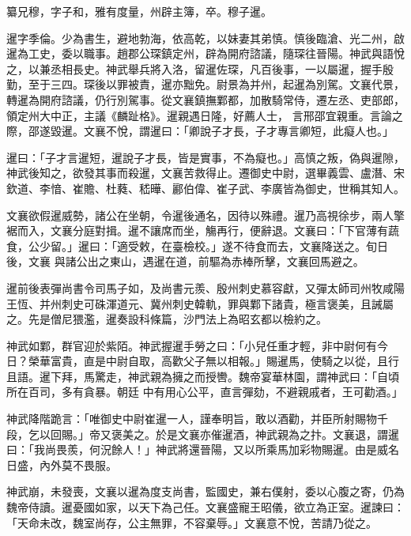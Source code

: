 \begin{pinyinscope}
 纂兄穆，字子和，雅有度量，州辟主簿，卒。穆子暹。



 暹字季倫。少為書生，避地勃海，依高乾，以妹妻其弟慎。慎後臨滄、光二州，啟暹為工史，委以職事。趙郡公琛鎮定州，辟為開府諮議，隨琛往晉陽。神武與語悅之，以兼丞相長史。神武舉兵將入洛，留暹佐琛，凡百後事，一以屬暹，握手殷勤，至于三四。琛後以罪被責，暹亦黜免。尉景為并州，起暹為別駕。文襄代景，轉暹為開府諮議，仍行別駕事。從文襄鎮撫鄴都，加散騎常侍，遷左丞、吏部郎，領定州大中正，主議《麟趾格》。暹親遇日隆，好薦人士，
 言邢邵宜親重。言論之際，邵遂毀暹。文襄不悅，謂暹曰：「卿說子才長，子才專言卿短，此癡人也。」



 暹曰：「子才言暹短，暹說子才長，皆是實事，不為癡也。」高慎之叛，偽與暹隙，神武後知之，欲發其事而殺暹，文襄苦救得止。遷御史中尉，選畢義雲、盧潛、宋欽道、李愔、崔贍、杜蕤、嵇曄、酈伯偉、崔子武、李廣皆為御史，世稱其知人。



 文襄欲假暹威勢，諸公在坐朝，令暹後通名，因待以殊禮。暹乃高視徐步，兩人擎裾而入，文襄分庭對揖。暹不讓席而坐，觴再行，便辭退。文襄曰：「下官薄有蔬食，公少留。」暹曰：「適受敕，在臺檢校。」遂不待食而去，文襄降送之。旬日後，文襄
 與諸公出之東山，遇暹在道，前驅為赤棒所擊，文襄回馬避之。



 暹前後表彈尚書令司馬子如，及尚書元羨、殷州刺史慕容獻，又彈太師司州牧咸陽王恆、并州刺史可硃渾道元、冀州刺史韓軌，罪與鄴下諸貴，極言褒美，且誡屬之。先是僧尼猥濫，暹奏設科條篇，沙門法上為昭玄都以檢約之。



 神武如鄴，群官迎於紫陌。神武握暹手勞之曰：「小兒任重才輕，非中尉何有今日？榮華富貴，直是中尉自取，高歡父子無以相報。」賜暹馬，使騎之以從，且行且語。暹下拜，馬驚走，神武親為擁之而授轡。魏帝宴華林園，謂神武曰：「自頃所在百司，多有貪暴。朝廷
 中有用心公平，直言彈劾，不避親戚者，王可勸酒。」



 神武降階跪言：「唯御史中尉崔暹一人，謹奉明旨，敢以酒勸，并臣所射賜物千段，乞以回賜。」帝又褒美之。於是文襄亦催暹酒，神武親為之抃。文襄退，謂暹曰：「我尚畏羨，何況餘人！」神武將還晉陽，又以所乘馬加彩物賜暹。由是威名日盛，內外莫不畏服。



 神武崩，未發喪，文襄以暹為度支尚書，監國史，兼右僕射，委以心腹之寄，仍為魏帝侍讀。暹憂國如家，以天下為己任。文襄盛寵王昭儀，欲立為正室。暹諫曰：「天命未改，魏室尚存，公主無罪，不容棄辱。」文襄意不悅，苦請乃從之。




\end{pinyinscope}
